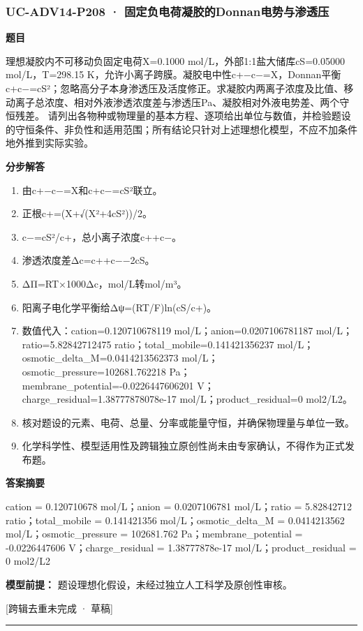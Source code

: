 \documentclass[UTF8,11pt,a4paper]{ctexart}
\begin{document}
\subsubsection*{UC-ADV14-P208 · 固定负电荷凝胶的Donnan电势与渗透压}
\noindent\textbf{题目}\par
理想凝胶内不可移动负固定电荷X=0.1000 mol/L，外部1:1盐大储库cS=0.05000 mol/L，T=298.15 K，允许小离子跨膜。凝胶电中性c+−c−=X，Donnan平衡c+c−=cS²；忽略高分子本身渗透压及活度修正。求凝胶内两离子浓度及比值、移动离子总浓度、相对外液渗透浓度差与渗透压Pa、凝胶相对外液电势差、两个守恒残差。 请列出各物种或物理量的基本方程、逐项给出单位与数值，并检验题设的守恒条件、非负性和适用范围；所有结论只针对上述理想化模型，不应不加条件地外推到实际实验。\par
\medskip\noindent\textbf{分步解答}
\begin{enumerate}
\item 由c+−c−=X和c+c−=cS²联立。
\item 正根c+=(X+√(X²+4cS²))/2。
\item c−=cS²/c+，总小离子浓度c++c−。
\item 渗透浓度差Δc=c++c−−2cS。
\item ΔΠ=RT×1000Δc，mol/L转mol/m³。
\item 阳离子电化学平衡给Δψ=(RT/F)ln(cS/c+)。
\item 数值代入：cation=0.120710678119 mol/L；anion=0.0207106781187 mol/L；ratio=5.82842712475 ratio；total\_mobile=0.141421356237 mol/L；osmotic\_delta\_M=0.0414213562373 mol/L；osmotic\_pressure=102681.762218 Pa；membrane\_potential=-0.0226447606201 V；charge\_residual=1.38777878078e-17 mol/L；product\_residual=0 mol2/L2。
\item 核对题设的元素、电荷、总量、分率或能量守恒，并确保物理量与单位一致。
\item 化学科学性、模型适用性及跨辑独立原创性尚未由专家确认，不得作为正式发布题。
\end{enumerate}
\noindent\textbf{答案摘要}\par
cation = 0.120710678 mol/L；anion = 0.0207106781 mol/L；ratio = 5.82842712 ratio；total\_mobile = 0.141421356 mol/L；osmotic\_delta\_M = 0.0414213562 mol/L；osmotic\_pressure = 102681.762 Pa；membrane\_potential = -0.0226447606 V；charge\_residual = 1.38777878e-17 mol/L；product\_residual = 0 mol2/L2\par
\noindent\textbf{模型前提：}
题设理想化假设，未经过独立人工科学及原创性审核。\par
\noindent\textcolor{red!65!black}{[跨辑去重未完成 · 草稿]} \par
\medskip\hrule\medskip
{}
\end{document}
